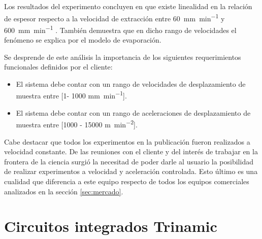 

Los resultados del experimento concluyen en que existe linealidad en la relación de espesor respecto a la velocidad de extracción entre \SI{60}{\milli\meter\per\minute} y \SI{600}{\milli\meter\per\minute} . También demuestra que en dicho rango de velocidades el fenómeno se explica por el modelo de evaporación.

Se desprende de este análisis la importancia de los siguientes requerimientos funcionales definidos por el cliente: 

\begin{itemize}
\item El sistema debe contar con un rango de velocidades de desplazamiento de muestra entre [1- 1000 \si{\milli\meter\per\minute}]. 
\item El sistema debe contar con un rango de aceleraciones de desplazamiento de muestra entre [1000 - 15000 \si{\meter\per\square\minute}].
		
\end{itemize}
	
Cabe destacar que todos los experimentos en la publicación fueron realizados a velocidad constante. De las reuniones con el cliente y del interés de trabajar en la frontera de la ciencia surgió la necesitad de poder darle al usuario la posibilidad de realizar experimentos a velocidad y aceleración controlada. Esto último es una cualidad que diferencia a este equipo respecto de todos los equipos comerciales analizados en la sección \ref{sec:mercado}.

 


\section{Circuitos integrados Trinamic}
\label{sec:Circuitos integrados Trinamic}

